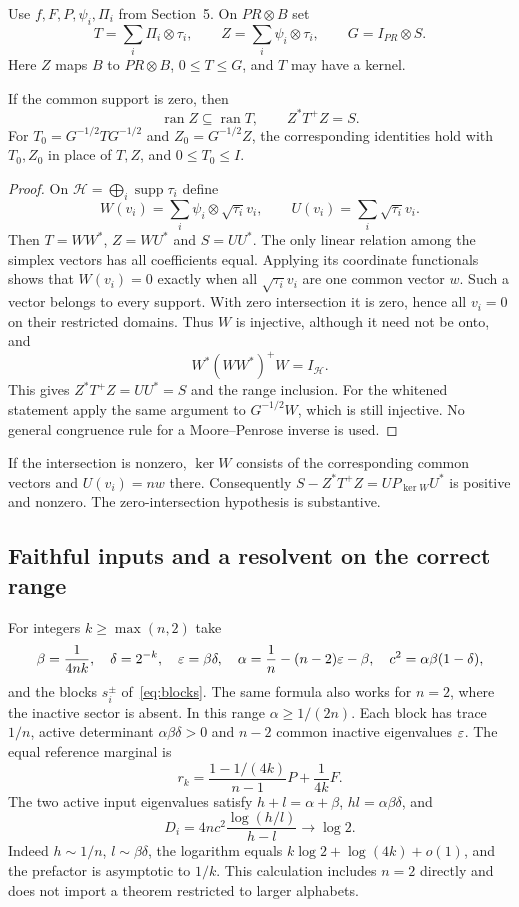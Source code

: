 Use $f,F,P,\psi_i,\Pi_i$ from Section~5. On $PR\otimes B$ set
\[
 T=\sum_i\Pi_i\otimes\tau_i,\qquad
 Z=\sum_i\psi_i\otimes\tau_i,\qquad
 G=I_{PR}\otimes S.
\]
Here $Z$ maps $B$ to $PR\otimes B$, $0\leq T\leq G$, and $T$ may have a kernel.

\begin{lemma}\label{lem:cq-gram}
If the common support is zero, then
\[
 \operatorname{ran}Z\subseteq\operatorname{ran}T,
 \qquad Z^*T^+Z=S.
\]
For $T_0=G^{-1/2}TG^{-1/2}$ and $Z_0=G^{-1/2}Z$, the corresponding identities hold with $T_0,Z_0$ in place of $T,Z$, and $0\leq T_0\leq I$.
\end{lemma}
\begin{proof}
On $\mathcal H=\bigoplus_i\operatorname{supp}\tau_i$ define
\[
 W(v_i)=\sum_i\psi_i\otimes\sqrt{\tau_i}v_i,
 \qquad U(v_i)=\sum_i\sqrt{\tau_i}v_i.
\]
Then $T=WW^*$, $Z=WU^*$ and $S=UU^*$. The only linear relation among the simplex vectors has all coefficients equal. Applying its coordinate functionals shows that $W(v_i)=0$ exactly when all $\sqrt{\tau_i}v_i$ are one common vector $w$. Such a vector belongs to every support. With zero intersection it is zero, hence all $v_i=0$ on their restricted domains. Thus $W$ is injective, although it need not be onto, and
\[
 W^*(WW^*)^+W=I_{\mathcal H}.
\]
This gives $Z^*T^+Z=UU^*=S$ and the range inclusion. For the whitened statement apply the same argument to $G^{-1/2}W$, which is still injective. No general congruence rule for a Moore--Penrose inverse is used.
\end{proof}
If the intersection is nonzero, $\ker W$ consists of the corresponding common vectors and $U(v_i)=nw$ there. Consequently $S-Z^*T^+Z=U P_{\ker W}U^*$ is positive and nonzero. The zero-intersection hypothesis is substantive.

\subsection{Faithful inputs and a resolvent on the correct range}
For integers $k\geq\max(n,2)$ take
\[
 \beta=\frac1{4nk},\quad\delta=2^{-k},\quad\varepsilon=\beta\delta,
 \quad\alpha=\frac1n-(n-2)\varepsilon-\beta,
 \quad c^2=\alpha\beta(1-\delta),
\]
and the blocks $s_i^\pm$ of~\eqref{eq:blocks}. The same formula also works for $n=2$, where the inactive sector is absent. In this range $\alpha\geq1/(2n)$. Each block has trace $1/n$, active determinant $\alpha\beta\delta>0$ and $n-2$ common inactive eigenvalues $\varepsilon$. The equal reference marginal is
\[
 r_k=\frac{1-1/(4k)}{n-1}P+\frac1{4k}F.
\]
The two active input eigenvalues satisfy $h+l=\alpha+\beta$, $hl=\alpha\beta\delta$, and
\[
 D_i=4nc^2\frac{\log(h/l)}{h-l}\longrightarrow\log2.
\]
Indeed $h\sim1/n$, $l\sim\beta\delta$, the logarithm equals $k\log2+\log(4k)+o(1)$, and the prefactor is asymptotic to $1/k$. This calculation includes $n=2$ directly and does not import a theorem restricted to larger alphabets.

